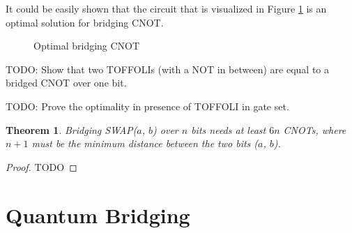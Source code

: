 \documentclass{report}
\newtheorem{theorem}{Theorem}
\begin{document}
It could be easily shown that the circuit that is visualized in Figure \ref{fig:optimal-bridging-cnot} is an optimal solution for bridging CNOT.

\begin{figure}[ht]
  \centering
  \caption{Optimal bridging CNOT}
  \label{fig:optimal-bridging-cnot}
\end{figure}

TODO: Show that two TOFFOLIs (with a NOT in between) are equal to a bridged CNOT over one bit.

TODO: Prove the optimality in presence of TOFFOLI in gate set.

\begin{theorem}
  Bridging SWAP($a$, $b$) over $n$ bits needs at least $6n$ CNOTs, where $n + 1$ must be the minimum distance between the two bits ($a$, $b$).
  \label{thm:bridging-swap}
\end{theorem}
\begin{proof}
  TODO
\end{proof}

\section{Quantum Bridging}
\end{document}
